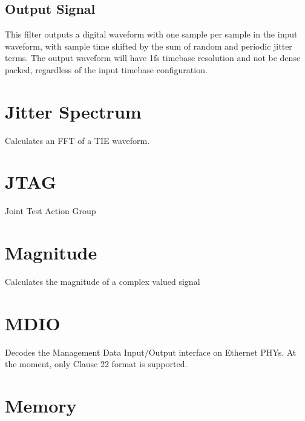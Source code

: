 \subsection{Output Signal}

This filter outputs a digital waveform with one sample per sample in the input waveform, with sample time shifted by
the sum of random and periodic jitter terms. The output waveform will have 1fs timebase resolution and not be dense
packed, regardless of the input timebase configuration.

\pagebreak
\section{Jitter Spectrum}

Calculates an FFT of a TIE waveform.

\pagebreak
\section{JTAG}

Joint Test Action Group

\pagebreak
\section{Magnitude}

Calculates the magnitude of a complex valued signal

\pagebreak
\section{MDIO}

Decodes the Management Data Input/Output interface on Ethernet PHYs. At the moment, only Clause 22 format is supported.

\pagebreak
\section{Memory}

